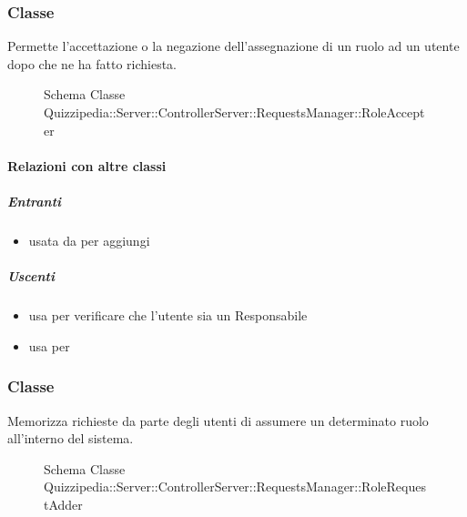 \subsubsection{Classe }
Permette l'accettazione o la negazione dell'assegnazione di un ruolo ad un utente dopo che ne ha fatto richiesta.
\begin{figure}[H]
\centering
\noindent{}
\caption[Schema Classe RoleAccepter]{Schema Classe Quizzipedia::Server::ControllerServer::RequestsManager::RoleAccepter}
\end{figure}
\paragraph{Relazioni con altre classi}
\subparagraph{Entranti}
\begin{itemize}
\item usata da  per aggiungi
\end{itemize}
\subparagraph{Uscenti}
\begin{itemize}
\item usa  per verificare che l'utente sia un Responsabile
\item usa  per 
\end{itemize}
\subsubsection{Classe }
Memorizza richieste da parte degli utenti di assumere un determinato ruolo all'interno del sistema.
\begin{figure}[H]
\centering
\noindent{}
\caption[Schema Classe RoleRequestAdder]{Schema Classe Quizzipedia::Server::ControllerServer::RequestsManager::RoleRequestAdder}
\end{figure}
